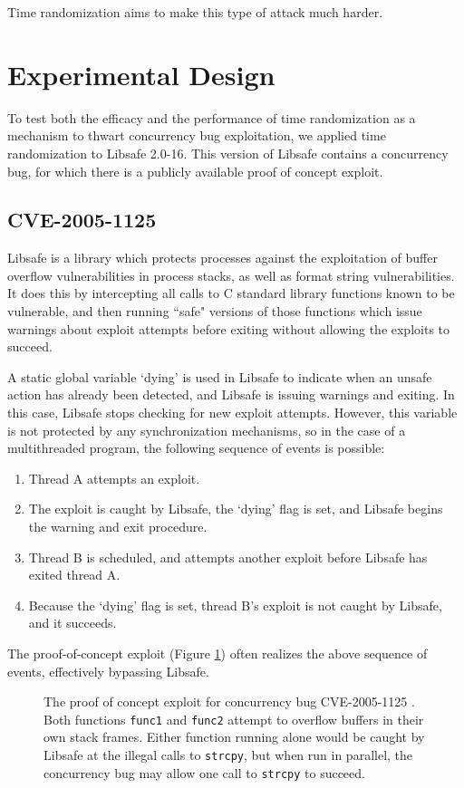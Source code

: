 \documentclass[letterpaper,twocolumn,10pt]{article}
\begin{document}
Time randomization aims to make this type of attack much harder.

\section{Experimental Design}
To test both the efficacy and the performance of time randomization as a mechanism to thwart concurrency bug exploitation, we applied time randomization to Libsafe 2.0-16.  This version of Libsafe contains a concurrency bug, for which there is a publicly available proof of concept exploit.
\subsection{CVE-2005-1125}
Libsafe is a library which protects processes against the exploitation of buffer overflow vulnerabilities in process stacks, as well as format string vulnerabilities.  It does this by intercepting all calls to C standard library functions known to be vulnerable, and then running ``safe" versions of those functions which issue warnings about exploit attempts before exiting without allowing the exploits to succeed.

A static global variable `dying' is used in Libsafe to indicate when an unsafe action has already been detected, and Libsafe is issuing warnings and exiting.  In this case, Libsafe stops checking for new exploit attempts.  However, this variable is not protected by any synchronization mechanisms, so in the case of a multithreaded program, the following sequence of events is possible:
\begin{enumerate}
	\item Thread A attempts an exploit.
	\item The exploit is caught by Libsafe, the `dying' flag is set, and Libsafe begins the warning and exit procedure.
	\item Thread B is scheduled, and attempts another exploit before Libsafe has exited thread A.
	\item Because the `dying' flag is set, thread B's exploit is not caught by Libsafe, and it succeeds.
\end{enumerate}
The proof-of-concept exploit (Figure \ref{fig_poc}) often realizes the above sequence of events, effectively bypassing Libsafe.
\begin{figure}

\caption{The proof of concept exploit for concurrency bug CVE-2005-1125 \cite{CVE2005-1125}.  Both functions \texttt{func1} and \texttt{func2} attempt to overflow buffers in their own stack frames.  Either function running alone would be caught by Libsafe at the illegal calls to \texttt{strcpy}, but when run in parallel, the concurrency bug may allow one call to \texttt{strcpy} to succeed.}
\label{fig_poc}
\end{figure}
\end{document}
